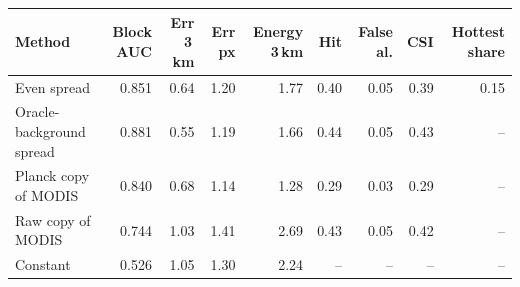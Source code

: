 \begin{tabular}{lrrrrrrrr}
\toprule
Method & Block AUC & Err 3\,km & Err px & Energy 3\,km & Hit & False al. & CSI & Hottest share \\
\midrule
Even spread & 0.851 & 0.64 & 1.20 & 1.77 & 0.40 & 0.05 & 0.39 & 0.15 \\
Oracle-background spread & 0.881 & 0.55 & 1.19 & 1.66 & 0.44 & 0.05 & 0.43 & -- \\
Planck copy of MODIS & 0.840 & 0.68 & 1.14 & 1.28 & 0.29 & 0.03 & 0.29 & -- \\
Raw copy of MODIS & 0.744 & 1.03 & 1.41 & 2.69 & 0.43 & 0.05 & 0.42 & -- \\
Constant & 0.526 & 1.05 & 1.30 & 2.24 & -- & -- & -- & -- \\
\bottomrule
\end{tabular}
